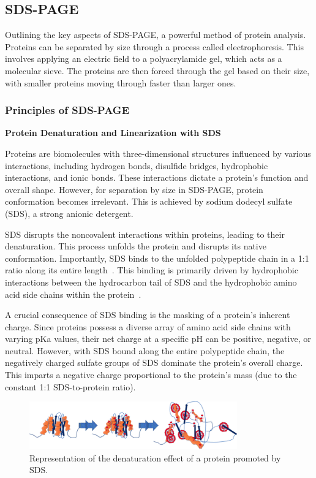 \newpage

\subsection{SDS-PAGE\authorB}
Outlining the key aspects of SDS-PAGE, a powerful method of protein analysis.
Proteins can be separated by size through a process called electrophoresis.
This involves applying an electric field to a polyacrylamide gel, which acts as a molecular sieve.
The proteins are then forced through the gel based on their size, with smaller proteins moving through faster than larger ones.

\subsubsection{Principles of SDS-PAGE}

\textbf{Protein Denaturation and Linearization with SDS}

Proteins are biomolecules with three-dimensional structures influenced by various interactions, including hydrogen bonds, disulfide bridges, hydrophobic interactions, and ionic bonds.
These interactions dictate a protein's function and overall shape.
However, for separation by size in SDS-PAGE, protein conformation becomes irrelevant.
This is achieved by sodium dodecyl sulfate (SDS), a strong anionic detergent.

SDS disrupts the noncovalent interactions within proteins, leading to their denaturation.
This process unfolds the protein and disrupts its native conformation. Importantly, SDS
binds to the unfolded polypeptide chain in a 1:1 ratio along its entire length~\cite{sdspageassay}. This
binding is primarily driven by hydrophobic interactions between the hydrocarbon tail of
SDS and the hydrophobic amino acid side chains within the protein~\cite{sdsimpact}.

A crucial consequence of SDS binding is the masking of a protein's inherent charge. Since
proteins possess a diverse array of amino acid side chains with varying pKa values, their
net charge at a specific pH can be positive, negative, or neutral. However, with SDS bound
along the entire polypeptide chain, the negatively charged sulfate groups of SDS
dominate the protein's overall charge. This imparts a negative charge proportional to the
protein's mass (due to the constant 1:1 SDS-to-protein ratio).

\begin{figure}[H]
    \centering
    \includegraphics[width=0.8\textwidth]{./media/images/sds_effect}
    \caption{Representation of the denaturation effect of a protein promoted by SDS.}
    \label{fig:sds_effect}
\end{figure}

